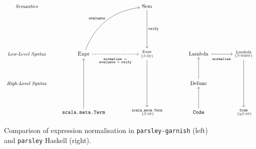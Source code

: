 \documentclass[../../../main.tex]{subfiles}
\begin{document}
\begin{figure}[htbp]
\begin{equation*}
  \begin{tikzcd}[row sep=3.5em,column sep=2em]
    {\small \textit{Semantics}}         &                                                                                                                                                           &  & \text{Sem} \arrow[dd, "\texttt{reify}"]               &  &                          &  &                                                            \\
                                        &                                                                                                                                                           &  &                                                       &  &                          &  &                                                            \\
    {\small \textit{Low-Level Syntax}}  & \text{Expr} \arrow[rruu, "\texttt{evaluate}", bend left] \arrow[rr, "\substack{\texttt{normalise}\ = \\ \texttt{evaluate}\ \circ\ \texttt{reify}}"' {yshift=-1ex}, dashed] &  & \substack{\text{Expr} \\ \text{($\beta$-\textsc{nf})}} \arrow[dd]          &  & \text{Lambda} \arrow[rr, "\texttt{normalise}"' {yshift=-1ex}] &  & \substack{\text{Lambda} \\ \text{($\beta$-\textsc{whnf})}} \arrow[dd] \\
    {\small \textit{High-Level Syntax}} &                                                                                                                                                           &  &                                                       &  & \text{Defunc} \arrow[u]  &  &                                                            \\
                                        & \texttt{scala.meta.Term} \arrow[uu]                                                                                                                       &  & \substack{\texttt{scala.meta.Term} \\ \text{ ($\beta$-\textsc{nf})}} &  & \texttt{Code} \arrow[u]  &  & \substack{\texttt{Code} \\ \text{ ($\eta\beta$-\textsc{nf})}}            
    \end{tikzcd}
  \end{equation*}
  \caption{Comparison of expression normalisation in \texttt{parsley-garnish} (left) and \texttt{parsley} Haskell (right).}
  \label{fig:nbe-vs-parsley}
\end{figure}
\end{document}

